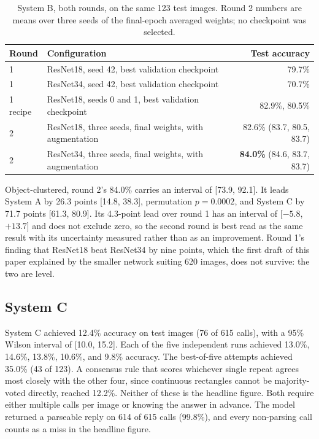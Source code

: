 \documentclass[12pt,letterpaper]{article}
\begin{document}
\begin{table}[H]
\centering
\caption{System B, both rounds, on the same 123 test images. Round 2
numbers are means over three seeds of the final-epoch averaged weights;
no checkpoint was selected.}
\label{tab:round2}
\begin{tabular}{llr}
\toprule
Round & Configuration & Test accuracy \\
\midrule
1 & ResNet18, seed 42, best validation checkpoint & 79.7\% \\
1 & ResNet34, seed 42, best validation checkpoint & 70.7\% \\
1 recipe & ResNet18, seeds 0 and 1, best validation checkpoint & 82.9\%, 80.5\% \\
2 & ResNet18, three seeds, final weights, with augmentation & 82.6\% (83.7, 80.5, 83.7) \\
2 & ResNet34, three seeds, final weights, with augmentation & \textbf{84.0\%} (84.6, 83.7, 83.7) \\
\bottomrule
\end{tabular}
\end{table}

Object-clustered, round 2's 84.0\% carries an interval of [73.9,
92.1]. It leads System A by 26.3 points [14.8, 38.3], permutation
$p = 0.0002$, and System C by 71.7 points [61.3, 80.9]. Its 4.3-point
lead over round 1 has an interval of [$-5.8$, $+13.7$] and does not
exclude zero, so the second round is best read as the same result with
its uncertainty measured rather than as an improvement. Round 1's
finding that ResNet18 beat ResNet34 by nine points, which the first
draft of this paper explained by the smaller network suiting 620
images, does not survive: the two are level.

\subsection{System C}

System C achieved 12.4\% accuracy on test images (76 of 615 calls),
with a 95\% Wilson interval of [10.0, 15.2]. Each of the five
independent runs achieved 13.0\%, 14.6\%, 13.8\%, 10.6\%, and 9.8\%
accuracy. The best-of-five attempts achieved 35.0\% (43 of 123). A
consensus rule that scores whichever single repeat agrees most closely
with the other four, since continuous rectangles cannot be
majority-voted directly, reached 12.2\%. Neither of these is the
headline figure. Both require either multiple calls per image or
knowing the answer in advance. The model returned a parseable reply on
614 of 615 calls (99.8\%), and every non-parsing call counts as a miss
in the headline figure.
\end{document}
